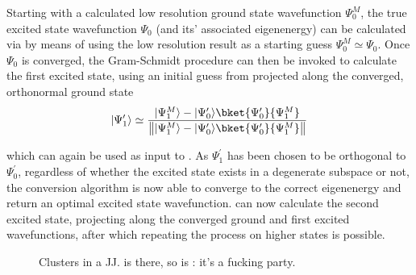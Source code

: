 Starting with a  calculated low resolution ground state wavefunction $\Psi_0^{M}$, the true excited state wavefunction $\Psi_0$ (and its' associated eigenenergy) can be calculated via  by means of using the low resolution result as a starting guess $\Psi_0^{M} \simeq \Psi_0$.
Once $\Psi_0$ is converged, the Gram-Schmidt procedure can then be invoked to calculate the first excited state, using an initial guess from  projected along the converged, orthonormal ground state
\begin{equation}
    \ket{\Psi^\prime_1} \simeq \frac{\ket{\Psi^M_1} - \ket{\Psi^\prime_0}\bket{\Psi^\prime_0}{\Psi^M_1}}{\norm[\big]{\ket{\Psi^M_1} - \ket{\Psi^\prime_0}\bket{\Psi^\prime_0}{\Psi^M_1}}}
\end{equation}

which can again be used as input to .
As $\Psi^\prime_1$ has been chosen to be orthogonal to $\Psi^\prime_0$, regardless of whether the excited state exists in a degenerate subspace or not, the conversion algorithm is now able to converge to the correct eigenenergy and return an optimal excited state wavefunction.
 can now calculate the second excited state, projecting along the converged ground and first excited wavefunctions, after which repeating the process  on higher states is possible.

\begin{figure}[htp]
\tlsjjmargins
\begin{adjustwidth}{\tlsjjleft}{\tlsjjright}
\resizebox{\widefigure}{!}{}
  \caption[JJ TLS]{\label{fig:tlsinjj}Clusters in a JJ.  is there, so is : it's a fucking party.}
\end{adjustwidth}
\end{figure}

